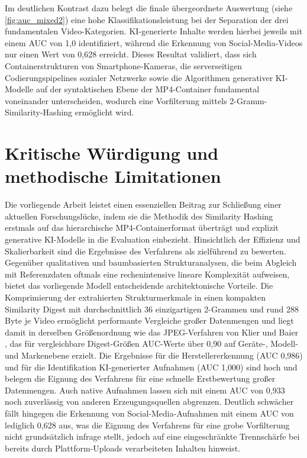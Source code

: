 Im deutlichen Kontrast dazu belegt die finale übergeordnete Auswertung (siehe \cref{fig:auc_mixed2}) eine hohe Klassifikationsleistung bei der Separation der drei fundamentalen Video-Kategorien. KI-generierte Inhalte werden hierbei jeweils mit einem AUC von 1,0 identifiziert, während die Erkennung von Social-Media-Videos nur einen Wert von 0,628 erreicht. Dieses Resultat validiert, dass sich Containerstrukturen von Smartphone-Kameras, die serverseitigen Codierungspipelines sozialer Netzwerke sowie die Algorithmen generativer KI-Modelle auf der syntaktischen Ebene der MP4-Container fundamental voneinander unterscheiden, wodurch eine Vorfilterung mittels 2-Gramm-Similarity-Hashing ermöglicht wird.


\section{Kritische Würdigung und methodische Limitationen}
\label{sec:evalkritischewürdigung}
Die vorliegende Arbeit leistet einen essenziellen Beitrag zur Schließung einer aktuellen Forschungslücke, indem sie die Methodik des Similarity Hashing erstmals auf das hierarchische MP4-Containerformat überträgt und explizit generative KI-Modelle in die Evaluation einbezieht. Hinsichtlich der Effizienz und Skalierbarkeit sind die Ergebnisse des Verfahrens als zielführend zu bewerten. Gegenüber qualitativen und baumbasierten Strukturanalysen, die beim Abgleich mit Referenzdaten oftmals eine rechenintensive lineare Komplexität aufweisen, bietet das vorliegende Modell entscheidende architektonische Vorteile. Die Komprimierung der extrahierten Strukturmerkmale in einen kompakten Similarity Digest mit durchschnittlich 36 einzigartigen 2-Grammen und rund 288 Byte je Video ermöglicht performante Vergleiche großer Datenmengen und liegt damit in derselben Größenordnung wie das JPEG-Verfahren von Klier und Baier \cite[Kap. 4]{klier_media_2025}, das für vergleichbare Digest-Größen AUC-Werte über 0,90 auf Geräte-, Modell- und Markenebene erzielt. Die Ergebnisse für die Herstellererkennung (AUC 0,986) und für die Identifikation KI-generierter Aufnahmen (AUC 1,000) sind hoch und belegen die Eignung des Verfahrens für eine schnelle Erstbewertung großer Datenmengen. Auch native Aufnahmen lassen sich mit einem AUC von 0,933 noch zuverlässig von anderen Erzeugungsquellen abgrenzen. Deutlich schwächer fällt hingegen die Erkennung von Social-Media-Aufnahmen mit einem AUC von lediglich 0,628 aus, was die Eignung des Verfahrens für eine grobe Vorfilterung nicht grundsätzlich infrage stellt, jedoch auf eine eingeschränkte Trennschärfe bei bereits durch Plattform-Uploads verarbeiteten Inhalten hinweist.

